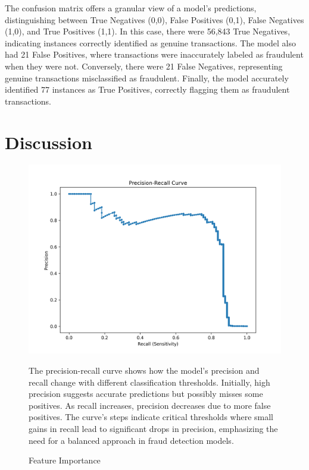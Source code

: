 \documentclass{article}
\begin{document}
The confusion matrix offers a granular view of a model's predictions, distinguishing between True Negatives (0,0), False Positives (0,1), False Negatives (1,0), and True Positives (1,1). In this case, there were 56,843 True Negatives, indicating instances correctly identified as genuine transactions. The model also had 21 False Positives, where transactions were inaccurately labeled as fraudulent when they were not. Conversely, there were 21 False Negatives, representing genuine transactions misclassified as fraudulent. Finally, the model accurately identified 77 instances as True Positives, correctly flagging them as fraudulent transactions. 


\section{Discussion}


\begin{figure}[H]
\centering
\begin{minipage}{0.48\textwidth} 
\centering
\includegraphics[width=\textwidth]{precision_recall_curve.png}
\caption{Feature Importance}
\end{minipage}\hfill
\begin{minipage}{0.48\textwidth} 
The precision-recall curve shows how the model's precision and recall change with different classification thresholds. Initially, high precision suggests accurate predictions but possibly misses some positives. As recall increases, precision decreases due to more false positives. The curve's steps indicate critical thresholds where small gains in recall lead to significant drops in precision, emphasizing the need for a balanced approach in fraud detection models.
\end{minipage}
\end{figure}
\end{document}
